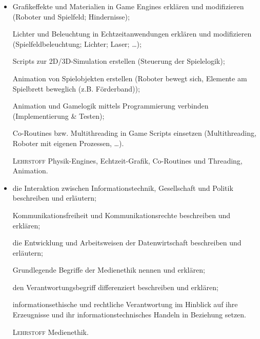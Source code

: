 \begin{itemize}[label={-}]
    \item Grafikeffekte und Materialien in Game Engines erklären und modifizieren
        {\color{red}(Roboter und Spielfeld; Hindernisse)};
    \item[] Lichter und Beleuchtung in Echtzeitanwendungen erklären und modifizieren
        {\color{red}(Spielfeldbeleuchtung; Lichter; Laser; \dots)};
    \item[] Scripts zur 2D/3D-Simulation erstellen
        {\color{red}(Steuerung der Spielelogik)};
    \item[] Animation von Spielobjekten erstellen
        {\color{red}(Roboter bewegt sich, Elemente am Spielbrett beweglich (z.B. Förderband))};
    \item[] Animation und Gamelogik mittels Programmierung verbinden
        {\color{red}(Implementierung \& Testen)};
    \item[] Co-Routines bzw. Multithreading in Game Scripts einsetzen
        {\color{red}(Multithreading, Roboter mit eigenen Prozessen, \dots)}.
    \item[\tiny\textsc{Lehrstoff}] Physik-Engines, Echtzeit-Grafik, Co-Routines und Threading, Animation.
\end{itemize}

\begin{itemize}[label={-}]
    \item die Interaktion zwischen Informationstechnik, Gesellschaft und Politik beschreiben und erläutern;
    \item[] Kommunikationsfreiheit und Kommunikationsrechte beschreiben und erklären;
    \item[] die Entwicklung und Arbeitsweisen der Datenwirtschaft beschreiben und erläutern;
    \item[] Grundlegende Begriffe der Medienethik nennen und erklären;
    \item[] den Verantwortungsbegriff differenziert beschreiben und erklären;
    \item[] informationsethische und rechtliche Verantwortung im Hinblick auf ihre Erzeugnisse und ihr informationstechnisches Handeln in Beziehung setzen.
    \item[\tiny\textsc{Lehrstoff}] Medienethik.
\end{itemize}


